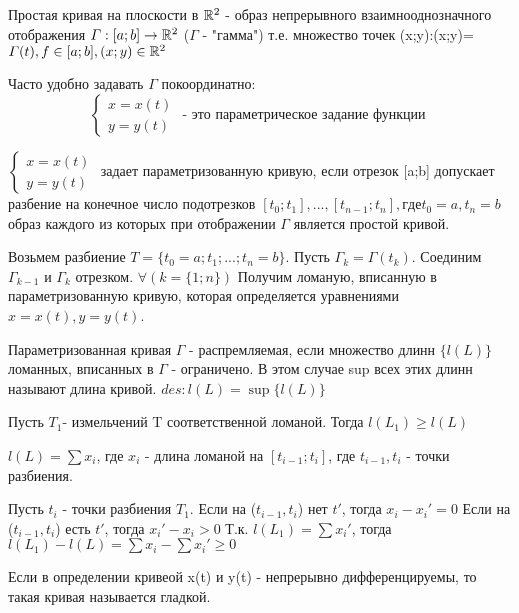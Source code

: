 \begin{opred}
Простая кривая на плоскости в $\mathbb{R}^2$ - образ непрерывного взаимнооднозначного отображения $ \varGamma:[a;b] \to \mathbb{R}^2$ ($\varGamma$ - "гамма") т.е. множество точек (x;y):{(x;y)=$\varGamma(t),f\in[a;b],(x;y)\in \mathbb{R}^2$}
\end{opred}
Часто удобно задавать $\varGamma$ покоординатно:
$$
\left\{
\begin{array}{l}
x=x(t) \\
y=y(t)
\end{array}
\right. \mbox{~- это параметрическое задание функции~}
$$

$
\left\{
\begin{array}{l}
x=x(t) \\
y=y(t)
\end{array}
\right.$ задает параметризованную кривую, если отрезок [a;b] допускает разбение на конечное число подотрезков 
$[t_0;t_1],...,[t_{n-1};t_n], где t_0=a, t_n=b$
образ каждого из которых при отображении $\varGamma$ является простой кривой.

\begin{opred}
Возьмем разбиение $T=\{t_0=a;t_1;...;t_n=b\}$.
Пусть $\varGamma_k=\varGamma(t_k)$. Соединим $\varGamma_{k-1}$ и $\varGamma_k$ отрезком. $\forall(k=\{1;n\})$
Получим ломаную, вписанную в параметризованную кривую, которая определяется уравнениями $x=x(t), y=y(t)$.
\end{opred}

\begin{opred}
	Параметризованная кривая $\varGamma$ - распремляемая, если множество длинн $\{l(L)\}$ ломанных, вписанных в $\varGamma$ - ограничено. В этом случае sup всех этих длинн называют длина кривой.
	$des: l(L)=\sup \{l(L)\}$
\end{opred}

\begin{teorema}
Пусть $T_1$- измельчений T соответственной ломаной. Тогда $l(L_1) \geqslant l(L)$
\end{teorema}
	
\dokvo
$l(L)=\sum x_i$, где $x_i$ - длина ломаной на $[t_{i-1};t_i]$, где $t_{i-1},t_i$ - точки разбиения.

Пусть $t_i$ - точки разбиения $T_1$.
Если на ($t_{i-1},t_i$) нет $t'$, тогда $x_i-{x_i}' = 0$
Если на ($t_{i-1},t_i$) есть $t'$, тогда ${x_i}'-x_i > 0$
Т.к. $l(L_1)=\sum {x_i'}$, тогда $l(L_1)-l(L)=\sum x_i - \sum {x_i}' \geqslant 0$
\dokno

\begin{opred}
	Если в определении кривеой x(t) и y(t) - непрерывно дифференцируемы, то такая кривая называется гладкой.
\end{opred}

